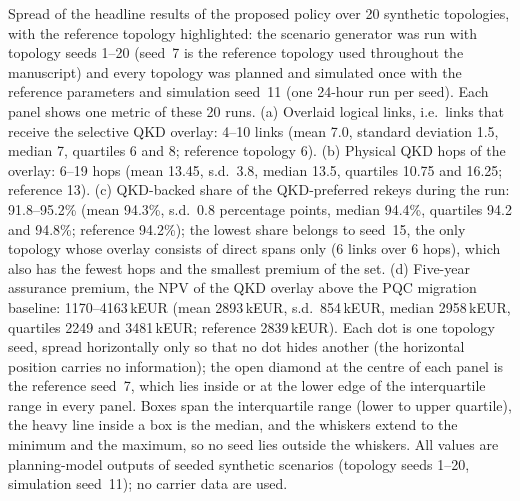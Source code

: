 Spread of the headline results of the proposed policy over 20 synthetic
topologies, with the reference topology highlighted: the scenario generator
was run with topology seeds 1--20 (seed~7 is the reference topology used
throughout the manuscript) and every topology was planned and simulated once
with the reference parameters and simulation seed~11 (one 24-hour run per
seed). Each panel shows one metric of these 20 runs.
(a) Overlaid logical links, i.e.\ links that receive the selective QKD
overlay: 4--10 links (mean 7.0, standard deviation 1.5, median 7, quartiles 6
and 8; reference topology 6).
(b) Physical QKD hops of the overlay: 6--19 hops (mean 13.45, s.d.\ 3.8,
median 13.5, quartiles 10.75 and 16.25; reference 13).
(c) QKD-backed share of the QKD-preferred rekeys during the run:
91.8--95.2\% (mean 94.3\%, s.d.\ 0.8 percentage points, median 94.4\%,
quartiles 94.2 and 94.8\%; reference 94.2\%); the lowest share belongs to
seed~15, the only topology whose overlay consists of direct spans only
(6 links over 6 hops), which also has the fewest hops and the smallest premium
of the set.
(d) Five-year assurance premium, the NPV of the QKD overlay above the PQC
migration baseline: 1170--4163\,kEUR (mean 2893\,kEUR, s.d.\ 854\,kEUR,
median 2958\,kEUR, quartiles 2249 and 3481\,kEUR; reference 2839\,kEUR).
Each dot is one topology seed, spread horizontally only so that no dot hides
another (the horizontal position carries no information); the open diamond at
the centre of each panel is the reference seed~7, which lies inside or at the
lower edge of the interquartile range in every panel. Boxes span the
interquartile range (lower to upper quartile), the heavy line inside a box is
the median, and the whiskers extend to the minimum and the maximum, so no
seed lies outside the whiskers. All values are planning-model outputs of
seeded synthetic scenarios (topology seeds 1--20, simulation seed~11); no
carrier data are used.
